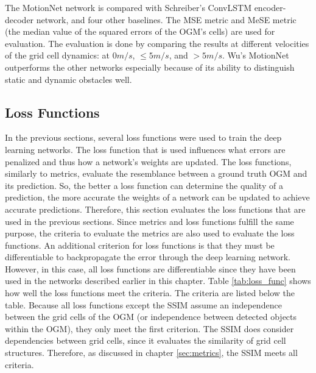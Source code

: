 The MotionNet network \cite{wu2020motionnet} is compared with Schreiber's \cite{schreiber2019long} \gls{ConvLSTM} encoder-decoder network, and four other baselines. The \gls{MSE} metric and \gls{MeSE} metric (the median value of the squared errors of the \gls{OGM}'s cells) are used for evaluation. The evaluation is done by comparing the results at different velocities of the grid cell dynamics: at $0 m/s$, $\leq 5 m/s$, and $> 5 m/s$. Wu's \cite{wu2020motionnet} MotionNet outperforms the other networks especially because of its ability to distinguish static and dynamic obstacles well.  

\subsection{Loss Functions} \label{subsec:lossfunc}
In the previous sections, several loss functions were used to train the deep learning networks. The loss function that is used influences what errors are penalized and thus how a network's weights are updated. The loss functions, similarly to metrics, evaluate the resemblance between a ground truth \gls{OGM} and its prediction. So, the better a loss function can determine the quality of a prediction, the more accurate the weights of a network can be updated to achieve accurate predictions. Therefore, this section evaluates the loss functions that are used in the previous sections. Since metrics and loss functions fulfill the same purpose, the criteria to evaluate the metrics are also used to evaluate the loss functions. An additional criterion for loss functions is that they must be differentiable to backpropagate the error through the deep learning network. However, in this case, all loss functions are differentiable since they have been used in the networks described earlier in this chapter. Table \ref{tab:loss_func} shows how well the loss functions meet the criteria. The criteria are listed below the table. Because all loss functions except the \gls{SSIM} assume an independence between the grid cells of the \gls{OGM} (or independence between detected objects within the \gls{OGM}), they only meet the first criterion. The \gls{SSIM} does consider dependencies between grid cells, since it evaluates the similarity of grid cell structures. Therefore, as discussed in chapter \ref{sec:metrics}, the \gls{SSIM} meets all criteria. 

